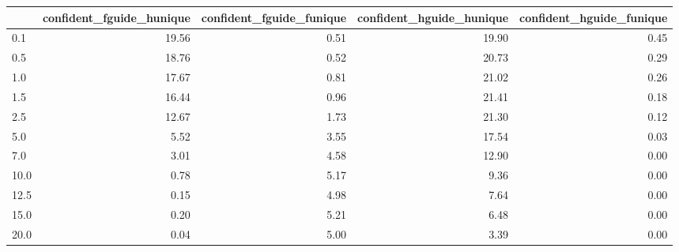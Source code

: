\begin{tabular}{lrrrr}
\toprule
 & confident_fguide_hunique & confident_fguide_funique & confident_hguide_hunique & confident_hguide_funique \\
\midrule
0.1 & 19.56 & 0.51 & 19.90 & 0.45 \\
0.5 & 18.76 & 0.52 & 20.73 & 0.29 \\
1.0 & 17.67 & 0.81 & 21.02 & 0.26 \\
1.5 & 16.44 & 0.96 & 21.41 & 0.18 \\
2.5 & 12.67 & 1.73 & 21.30 & 0.12 \\
5.0 & 5.52 & 3.55 & 17.54 & 0.03 \\
7.0 & 3.01 & 4.58 & 12.90 & 0.00 \\
10.0 & 0.78 & 5.17 & 9.36 & 0.00 \\
12.5 & 0.15 & 4.98 & 7.64 & 0.00 \\
15.0 & 0.20 & 5.21 & 6.48 & 0.00 \\
20.0 & 0.04 & 5.00 & 3.39 & 0.00 \\
\bottomrule
\end{tabular}
